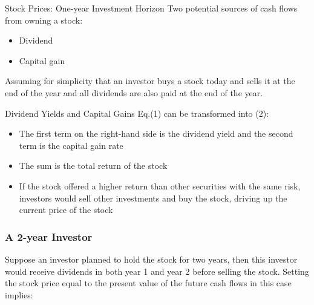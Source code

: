 \documentclass[9pt,aspectratio=169]{beamer}
\begin{document}
\begin{frame}{Stock Prices: One-year Investment Horizon}
Two potential sources of cash flows from owning a stock:
\begin{itemize}
\item Dividend
\item Capital gain
\end{itemize}

\vspace{0.5cm}
Assuming for simplicity that an investor buys a stock today and sells it at the end of the
year and all dividends are also paid at the end of the year.

\vspace{0.5cm}
\begin{center}
\end{center}
\end{frame}


\begin{frame}{Dividend Yields and Capital Gains}
Eq.(1) can be transformed into (2):

\vspace{0.5cm}
\begin{center}
\end{center}

\vspace{0.5cm}
\begin{itemize}
\item The first term on the right-hand side is the dividend yield and the second term is the capital gain rate
\item The sum is the total return of the stock
\item If the stock offered a higher return than other securities with the same risk, investors would sell other investments and buy the stock, driving up the current price of the stock
\end{itemize}
\end{frame}

\begin{frame}
\frametitle{A 2-year Investor}
Suppose an investor planned to hold the stock for two years, then this investor would
receive dividends in both year 1 and year 2 before selling the stock. Setting the stock
price equal to the present value of the future cash flows in this case implies:

\vspace{1cm}
\begin{center}
\end{center}
\end{frame}
\end{document}
